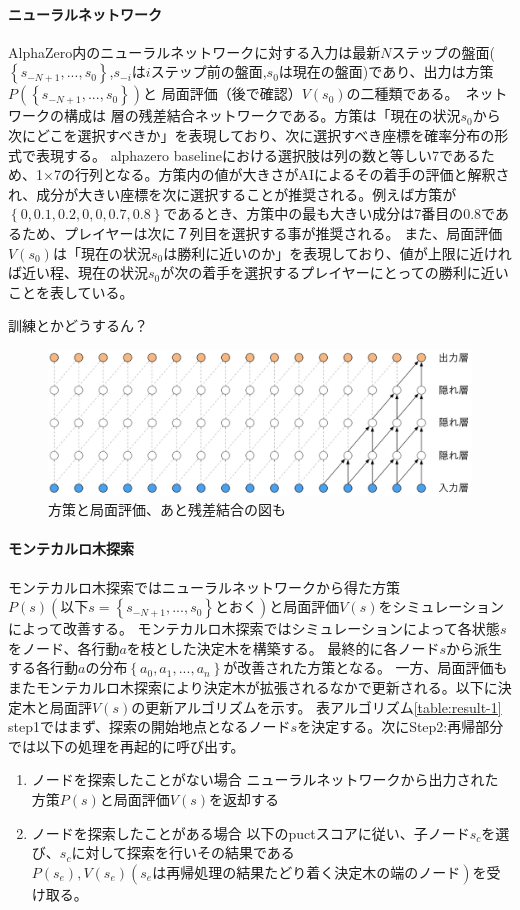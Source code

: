 \paragraph{ニューラルネットワーク}
AlphaZero内のニューラルネットワークに対する入力は最新$N$ステップの盤面($\left\{ s_{-N+1}, ..., s_0 \right\}$,$s_{-i}$は$i$ステップ前の盤面,$s_{0}$は現在の盤面)であり、出力は方策$P(\left\{ s_{-N+1}, ..., s_0 \right\})$と
局面評価（後で確認）$V(s_0)$の二種類である。\
ネットワークの構成は 層の残差結合ネットワークである。方策は「現在の状況$s_0$から次にどこを選択すべきか」を表現しており、次に選択すべき座標を確率分布の形式で表現する。
alphazero baselineにおける選択肢は列の数と等しい7であるため、1$\times$7の行列となる。方策内の値が大きさがAIによるその着手の評価と解釈され、成分が大きい座標を次に選択することが推奨される。例えば方策が
$\left\{0, 0.1, 0.2, 0, 0, 0.7, 0.8\right\}$であるとき、方策中の最も大きい成分は7番目の0.8であるため、プレイヤーは次に７列目を選択する事が推奨される。
また、局面評価$V(s_0)$は「現在の状況$s_0$は勝利に近いのか」を表現しており、値が上限に近ければ近い程、現在の状況$s_0$が次の着手を選択するプレイヤーにとっての勝利に近いことを表している。

訓練とかどうするん？
\begin{figure}[t]
	\centering
	\includegraphics[width=\linewidth]{./figure/ccl.png}
	\caption{方策と局面評価、あと残差結合の図も}
	\label{fig:ccl}
\end{figure}
\paragraph{モンテカルロ木探索}
モンテカルロ木探索ではニューラルネットワークから得た方策$P(s)(以下s=\left\{ s_{-N+1}, ..., s_0 \right\}とおく)$と局面評価$V(s)$をシミュレーション
によって改善する。
モンテカルロ木探索ではシミュレーションによって各状態$s$をノード、各行動$a$を枝とした決定木を構築する。
最終的に各ノード$s$から派生する各行動$a$の分布$\left\{a_0, a_1, ..., a_n\right\}$が改善された方策となる。
一方、局面評価もまたモンテカルロ木探索により決定木が拡張されるなかで更新される。以下に決定木と局面評$V(s)$の更新アルゴリズムを示す。
表アルゴリズム\ref{table:result-1}
step1ではまず、探索の開始地点となるノード$s$を決定する。次にStep2:再帰部分では以下の処理を再起的に呼び出す。
\begin{enumerate}
	\item ノードを探索したことがない場合
	ニューラルネットワークから出力された方策$P(s)$と局面評価$V(s)$を返却する
	\item ノードを探索したことがある場合
	以下のpuctスコアに従い、子ノード$s_c$を選び、$s_c$に対して探索を行いその結果である$P(s_e), V(s_e)(s_eは再帰処理の結果たどり着く
	決定木の端のノード)$を受け取る。
\end{enumerate}

